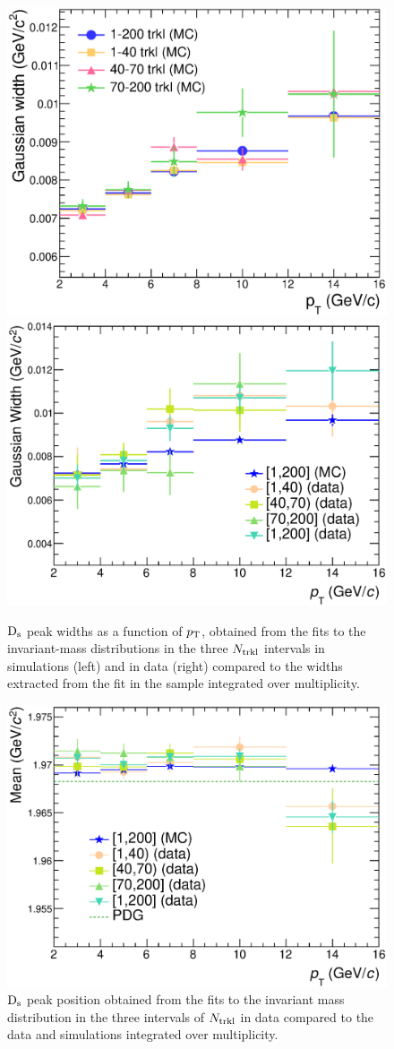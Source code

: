 \begin{figure}[htpb]
\centering
 \includegraphics[width=.48\textwidth]{FigCap6/comparisonSigmaDsMCBInsNtrkl.eps}
 \includegraphics[width=.5\textwidth]{FigCap6/DsSigma_DataMC_AllNtrklInt_Ntrkl.eps}
  \caption{${\rm D_s}$ peak widths as a function of $p_{\rm T}$, obtained from the fits to the invariant-mass distributions in the three $N_{\rm trkl}$ intervals in simulations (left) and in data (right) compared to the widths extracted from the fit in the sample integrated over multiplicity.}
 \label{fig:MCsigmaCompNtrklBins}
\end{figure}

\begin{figure}[htpb]
\centering
 \includegraphics[width=.5\textwidth]{FigCap6/DsMean_DataMC_AllNtrklInt_Ntrkl.eps}
  \caption{${\rm D_s}$ peak position obtained from the fits to the invariant mass distribution in the three intervals of $N_{\rm trkl}$ in data compared to the data and simulations integrated over multiplicity.}
 \label{fig:DsFitParamsVsNtrkl}
\end{figure}

